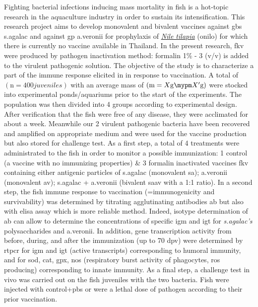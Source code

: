 Fighting bacterial infections inducing mass mortality in fish is a hot-topic research in the aquaculture industry in order to sustain its intensification. This research project aims to develop monovalent and bivalent vaccines against \ac{gbs} \acs{s.agalac} and against \ac{gp} \ac{a.veronii} for prophylaxis of \underline{\textit{Nile tilapia}} (\acs{onilo}) for which there is currently no vaccine available in Thailand.  In the present research, \acs{fkv} were produced by pathogen inactivation method: formalin 1\% - 3 \acs{(v/v)} is added to the virulent pathogenic solution. The objective of the study is to characterize a part of the immune response elicited in  in response to vaccination. A total of $(\mathrm{n} = 400 juveniles)$ with an average mass of $(\mathrm{m} = X\si{\gram} \mypm X'\si{\gram})$ were stocked into experimental ponds/aquariums prior to the start of the experiments. The population was then divided into 4 groups according to experimental design. After verification that the fish were free of any disease, they were acclimated for about a week. Meanwhile our 2 virulent pathogenic bacteria have been recovered and amplified on appropriate medium and were used for the vaccine production but also stored for challenge test. As a first step, a total of 4 treatments were administrated to the fish in order to monitor a possible immunization: 1 \Ac{control} (a vaccine with no immunizing properties) & 3 formalin inactivated vaccines \ac{fkv} containing either antigenic particles of \ac{s.agalac} (monovalent \acs{sa}); \ac{a.veronii} (monovalent \acs{av}); \ac{s.agalac} + \ac{a.veronii} (bivalent \acs{saav} with a 1:1 ratio). In a second step, the fish immune response to vaccination (=immunogenicity and survivability) was determined by titrating agglutinating antibodies \Acs{ab} but also with \acs{elisa} assay which is more reliable method. Indeed, isotype determination of \Acs{ab} can allow to determine the concentrations of specific \ac{igm} and \ac{igt} for \textit{\ac{s.agalac}'s} polysaccharides and \ac{a.veronii}. In addition, gene transcription activity from before, during, and after the immunization (up to 70 \ac{dpv}) were determined by \acs{rtpcr} for \ac{igm} and \ac{igt} (active transcripts) corresponding to humoral immunity, and for \ac{sod}, \ac{cat}, \ac{gpx}, \ac{nos} (respiratory burst activity of phagocytes, \ac{ros} producing) corresponding to innate immunity. As a final step, a challenge test in vivo was carried out on the fish juveniles with the two bacteria. Fish were injected with \acf{control}+\ac{pbs} or were  a lethal dose of pathogen according to their prior vaccination.

